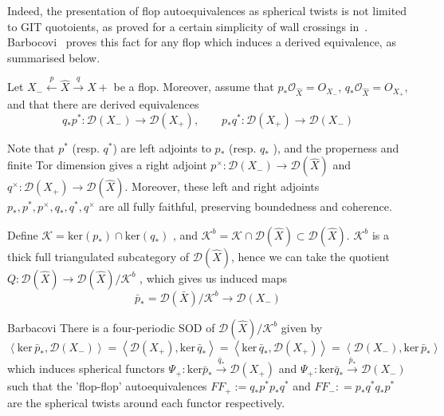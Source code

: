 Indeed, the presentation of flop autoequivalences as spherical twists is not limited to GIT quotoients, as proved for a certain simplicity of wall crossings in~\cite{halpernleistner2016autoequivalences}. Barbocovi~\cite{barbacovi_spherical_2021} proves this fact for any flop which induces a derived equivalence, as summarised below.

Let $X_{-}\xleftarrow{p} \hat{X} \xrightarrow{q} X+$ be a flop. Moreover, assume that $p_{*}\mathcal{O}_{\hat{X}}= O_{X_-}$, $q_{*}\mathcal{O}_{\hat{X}}= O_{X_+}$,  and that there are derived equivalences$$
q_{*}p^{*}: \mathcal{D}(X_{-})\to \mathcal{D}(X_{+}), \qquad p_{*}q^{*}: \mathcal{D}(X_{+})\to \mathcal{D}(X_{-})
$$

Note that $p^*$ (resp. $q^{*}$) are left adjoints to $p_*$ (resp. $q_{*}$ ), and the properness and finite Tor dimension gives a right adjoint $p^{\times}: \mathcal{D}(X_{-})\to \mathcal{D}(\hat{X})$ and $q^{\times}: \mathcal{D}(X_{+})\to \mathcal{D}(\hat{X})$. Moreover, these left and right adjoints $p_{*}, p^{*} ,p^{\times}, q_{*}, q^{*},q^{\times}$ are all fully faithful, preserving boundedness and coherence.  

Define $\mathcal{K} = \mathrm{ker}(p_{*}) \cap \mathrm{ker}(q_{*})$ , and $\mathcal{ K}^{b}= \mathcal{K} \cap \mathcal{D}(\hat{X}) \subset \mathcal{D}(\hat{X})$. $\mathcal{K}^b$  is a thick full triangulated subcategory of $\mathcal{D}(\hat{X})$, hence we can take the quotient $Q: \mathcal{D}(\hat{X})\to \mathcal{D}(\hat{X})/\mathcal{K}^b$ , which gives us  induced maps
$$\bar{p}_{*} = \mathcal{D}(\bar{ X})/ \mathcal{K}^{b}\to \mathcal{D}(X_{-})$$

\begin{theorem}{Barbacovi}{}
There is a  four-periodic SOD of $\mathcal{D}(\hat{X})/\mathcal{K}^b$ given by $$
\left< \mathrm{ker}\,\bar{p}_{*},\mathcal{D}(X_{-}) \right> =  \left< \mathcal{D}(X_{+}), \mathrm{ker}\,\bar{q}_{*} \right> = \left< \mathrm{ker}\,\bar{q}_{*} , \mathcal{D}(X_{+})\right> = \left< \mathcal{D}(X_{-}), \mathrm{ker}\,\bar{p}_{*} \right>  
$$ which induces spherical functors $\Psi_{+}: \mathrm{ker} \bar{p}_{*}\xrightarrow{\bar{q}_{*}}\mathcal{D}(X_+)$ and $\Psi_{+}: \mathrm{ker} \bar{q}_{*}\xrightarrow{\bar{p}_{*}}\mathcal{D}(X_-)$ such that the 'flop-flop' autoequivalences $FF _{+}:= q_{*}p^{*}p_{*}q^{*}$ and $F F_{-}: = p_{*}q^{*}q_{*}p^*$ are the spherical twists around each functor respectively.
\end{theorem}

